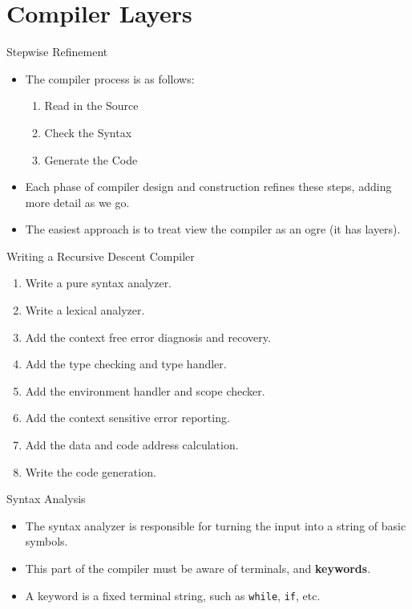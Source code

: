 \documentclass[]{beamer}
\begin{document}
\section{Compiler Layers}
\begin{frame}{Stepwise Refinement}
    \begin{itemize}[<+->]
        \item The compiler process is as follows:
        \begin{enumerate}
            \item Read in the Source
            \item Check the Syntax
            \item Generate the Code
        \end{enumerate}
        \item Each phase of compiler design and construction refines
          these steps, adding more detail as we go.
        \item The easiest approach is to treat view the compiler as
          an ogre (it has layers).
    \end{itemize}
\end{frame}

\begin{frame}{Writing a Recursive Descent Compiler}
    \begin{enumerate}[<+->]
        \item Write a pure syntax analyzer.
        \item Write a lexical analyzer.
        \item Add the context free error diagnosis and recovery.
        \item Add the type checking and type handler.
        \item Add the environment handler and scope checker.
        \item Add the context sensitive error reporting.
        \item Add the data and code address calculation.
        \item Write the code generation.
    \end{enumerate}
\end{frame}

\begin{frame}{Syntax Analysis}
    \begin{itemize}[<+->]
        \item The syntax analyzer is responsible for turning the input
            into a string of basic symbols.
        \item This part of the compiler must be aware of terminals,
            and \textbf{keywords}. 
        \item A keyword is a fixed terminal string, such as
            \texttt{while}, \texttt{if}, etc.
    \end{itemize}
\end{frame}
\end{document}
